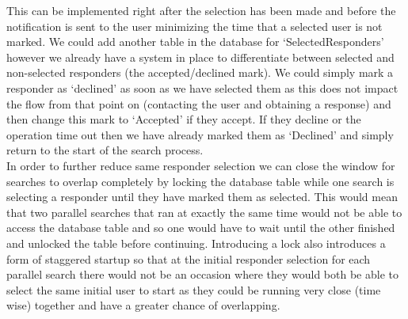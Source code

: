 \documentclass{article}
\begin{document}
This can be implemented right after the selection has been made and before the notification is sent to the user minimizing the time that a selected user is not marked. We could add another table in the database for ‘SelectedResponders’ however we already have a system in place to differentiate between selected and non-selected responders (the accepted/declined mark). We could simply mark a responder as ‘declined’ as soon as we have selected them as this does not impact the flow from that point on (contacting the user and obtaining a response) and then change this mark to ‘Accepted’ if they accept. If they decline or the operation time out then we have already marked them as ‘Declined’ and simply return to the start of the search process.\\

In order to further reduce same responder selection we can close the window for searches to overlap completely by locking the database table while one search is selecting a responder until they have marked them as selected. This would mean that two parallel searches that ran at exactly the same time would not be able to access the database table and so one would have to wait until the other finished and unlocked the table before continuing. Introducing a lock also introduces a form of staggered startup so that at the initial responder selection for each parallel search there would not be an occasion where they would both be able to select the same initial user to start as they could be running very close (time wise) together and have a greater chance of overlapping.\\
\end{document}
